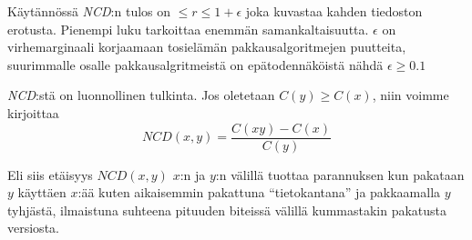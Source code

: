 \documentclass[11pt,finnish]{tktltiki2}
\theoremstyle{definition}
\theoremstyle{remark}
\begin{document}
  Käytännössä \emph{NCD}:n tulos on $ \leq r \leq 1+ \epsilon$ joka kuvastaa kahden tiedoston erotusta. Pienempi luku tarkoittaa enemmän samankaltaisuutta. $\epsilon$ on virhemarginaali korjaamaan tosielämän pakkausalgoritmejen puutteita, suurimmalle osalle pakkausalgritmeistä on epätodennäköistä nähdä $\epsilon \geq 0.1$

  \emph{NCD}:stä on luonnollinen tulkinta. Jos oletetaan $C(y) \geq C(x)$, niin voimme kirjoittaa
  $$ NCD(x,y) = \frac{C(xy)-C(x)}{C(y)} $$

  Eli siis etäisyys $NCD(x,y)$ $x$:n ja $y$:n välillä tuottaa parannuksen kun pakataan $y$ käyttäen $x$:ää kuten aikaisemmin pakattuna ``tietokantana'' ja pakkaamalla $y$ tyhjästä, ilmaistuna suhteena pituuden biteissä välillä kummastakin pakatusta versiosta.

%
%

%

% 





%
\end{document}
